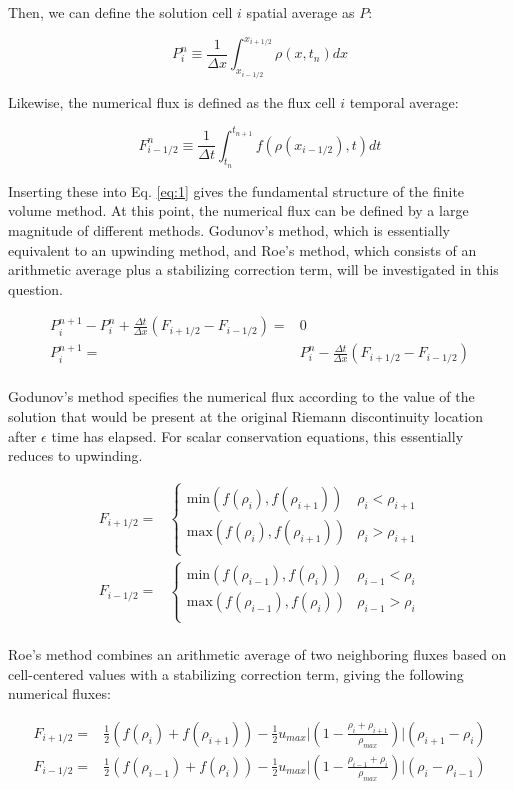 \documentclass[10pt]{article}
\newcommand{\beq}{\begin{equation}}
\newcommand{\eeq}{\end{equation}}
\newcommand{\beqa}{\begin{equation}\begin{aligned}}
\newcommand{\eeqa}{\end{aligned}\end{equation}}
\begin{document}
Then, we can define the solution cell \(i\) spatial average as \(P\):

\beq
P_i^{n}\equiv\frac{1}{\Delta x}\int_{x_{i-1/2}}^{x_{i+1/2}}\rho(x, t_{n}) dx
\eeq

Likewise, the numerical flux is defined as the flux cell \(i\) temporal average:

\beq
F_{i-1/2}^n\equiv\frac{1}{\Delta t}\int_{t_n}^{t_{n+1}}f(\rho(x_{i-1/2}),t)dt
\eeq

Inserting these into Eq. \eqref{eq:1} gives the fundamental structure of the finite volume method. At this point, the numerical flux can be defined by a large magnitude of different methods. Godunov's method, which is essentially equivalent to an upwinding method, and Roe's method, which consists of an arithmetic average plus a stabilizing correction term, will be investigated in this question.

\beqa
P_i^{n+1}-P_i^n+\frac{\Delta t}{\Delta x}\left(F_{i+1/2}-F_{i-1/2}\right)=&0\\
P_i^{n+1}=&P_i^n-\frac{\Delta t}{\Delta x}\left(F_{i+1/2}-F_{i-1/2}\right)\\
\eeqa

Godunov's method specifies the numerical flux according to the value of the solution that would be present at the original Riemann discontinuity location after \(\epsilon\) time has elapsed. For scalar conservation equations, this essentially reduces to upwinding. 

\beqa
F_{i+1/2}=&\begin{cases}\textrm{min}\left(f(\rho_i), f(\rho_{i+1})\right) & \rho_i < \rho_{i+1}\\
\textrm{max}\left(f(\rho_i), f(\rho_{i+1})\right) & \rho_i>\rho_{i+1}\\
\end{cases}\\
F_{i-1/2}=&\begin{cases}\textrm{min}\left(f(\rho_{i-1}), f(\rho_{i})\right) & \rho_{i-1} < \rho_{i}\\
\textrm{max}\left(f(\rho_{i-1}), f(\rho_{i})\right) & \rho_{i-1}>\rho_{i}\\
\end{cases}\\
\eeqa

Roe's method combines an arithmetic average of two neighboring fluxes based on cell-centered values with a stabilizing correction term, giving the following numerical fluxes:

\beqa
F_{i+1/2}=&\frac{1}{2}\left(f(\rho_i)+f(\rho_{i+1})\right)-\frac{1}{2}u_{max}\biggr\lvert\left(1-\frac{\rho_i+\rho_{i+1}}{\rho_{max}}\right)\biggr\rvert(\rho_{i+1}-\rho_{i})\\
F_{i-1/2}=&\frac{1}{2}\left(f(\rho_{i-1})+f(\rho_{i})\right)-\frac{1}{2}u_{max}\biggr\lvert\left(1-\frac{\rho_{i-1}+\rho_{i}}{\rho_{max}}\right)\biggr\rvert(\rho_{i}-\rho_{i-1})\\
\eeqa
\end{document}
